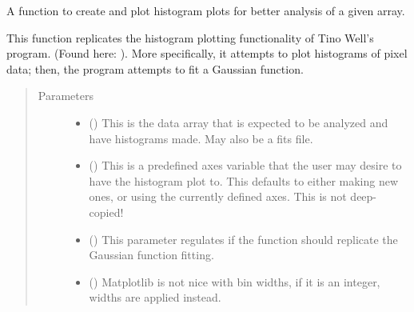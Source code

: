 \documentclass[letterpaper,10pt,english]{sphinxmanual}
\begin{document}
\begin{fulllineitems}
\label{\detokenize{python_docstrings/IfA_Smeargle.oscar.histograms:IfA_Smeargle.oscar.histograms.plot_array_histogram}}
A function to create and plot histogram plots for better analysis of
a given array.

This function replicates the histogram plotting functionality of Tino
Well’s program. (Found here: ). More
specifically, it attempts to plot histograms of pixel data; then, the
program attempts to fit a Gaussian function.
\begin{quote}\begin{description}
\item[{Parameters}] \leavevmode\begin{itemize}
\item {} 
 () \textendash{} This is the data array that is expected to be analyzed and have
histograms made. May also be a fits file.

\item {} 
 (\sphinxstyleliteralemphasis{\sphinxupquote{ (}}\sphinxstyleliteralemphasis{\sphinxupquote{)}}) \textendash{} This is a predefined axes variable that the user may desire to have
the histogram plot to. This defaults to either making new ones, or
using the currently defined axes. This is not deep-copied!

\item {} 
 (\sphinxstyleliteralemphasis{\sphinxupquote{ (}}\sphinxstyleliteralemphasis{\sphinxupquote{)}}) \textendash{} This parameter regulates if the function should replicate the
Gaussian function fitting.

\item {} 
 (\sphinxstyleliteralemphasis{\sphinxupquote{ (}}\sphinxstyleliteralemphasis{\sphinxupquote{)}}) \textendash{} Matplotlib is not nice with bin widths, if it is an integer, widths
are applied instead.


\end{itemize}
\end{description}
\end{quote}
\end{fulllineitems}
\end{document}
